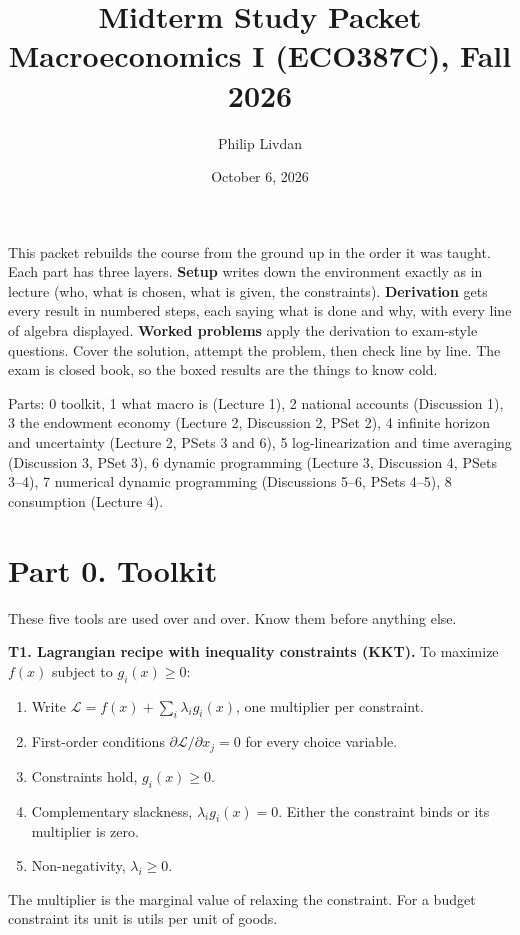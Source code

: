 \documentclass[12pt]{article}
\title{Midterm Study Packet\\[1mm] \large Macroeconomics I (ECO387C), Fall 2026}
\author{Philip Livdan}
\date{October 6, 2026}
\begin{document}
\maketitle

This packet rebuilds the course from the ground up in the order it was taught.
Each part has three layers. \textbf{Setup} writes down the environment exactly
as in lecture (who, what is chosen, what is given, the constraints).
\textbf{Derivation} gets every result in numbered steps, each saying what is
done and why, with every line of algebra displayed. \textbf{Worked problems}
apply the derivation to exam-style questions. Cover the solution, attempt the
problem, then check line by line. The exam is closed book, so the boxed results
are the things to know cold.

Parts: 0 toolkit, 1 what macro is (Lecture 1), 2 national accounts
(Discussion 1), 3 the endowment economy (Lecture 2, Discussion 2, PSet 2),
4 infinite horizon and uncertainty (Lecture 2, PSets 3 and 6),
5 log-linearization and time averaging (Discussion 3, PSet 3),
6 dynamic programming (Lecture 3, Discussion 4, PSets 3--4),
7 numerical dynamic programming (Discussions 5--6, PSets 4--5),
8 consumption (Lecture 4).

\tableofcontents
\newpage

\section*{Part 0. Toolkit}

These five tools are used over and over. Know them before anything else.

\textbf{T1. Lagrangian recipe with inequality constraints (KKT).}
To maximize $f(x)$ subject to $g_i(x)\ge0$:
\begin{enumerate}
\item Write $\mathcal L=f(x)+\sum_i\lambda_i g_i(x)$, one multiplier per constraint.
\item First-order conditions $\partial\mathcal L/\partial x_j=0$ for every choice variable.
\item Constraints hold, $g_i(x)\ge0$.
\item Complementary slackness, $\lambda_i g_i(x)=0$. Either the constraint binds or its multiplier is zero.
\item Non-negativity, $\lambda_i\ge0$.
\end{enumerate}
The multiplier is the marginal value of relaxing the constraint. For a budget
constraint its unit is utils per unit of goods.
\end{document}
